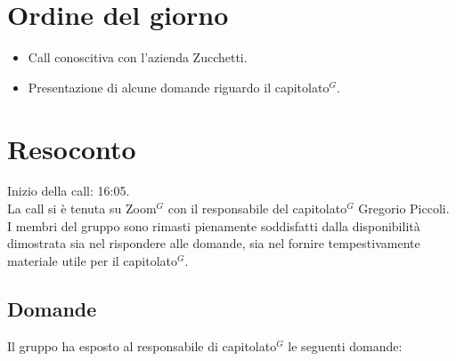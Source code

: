 \section{Ordine del giorno}

\begin{itemize}
	\item Call conoscitiva con l'azienda Zucchetti.
	\item Presentazione di alcune domande riguardo il capitolato$^{G}$.
\end{itemize}

\section{Resoconto}

\noindent 
Inizio della call: 16:05. \\
\noindent La call si è tenuta su Zoom$^{G}$ con il responsabile del capitolato$^{G}$ Gregorio Piccoli. 
I membri del gruppo sono rimasti pienamente soddisfatti dalla disponibilità dimostrata sia nel rispondere alle domande, sia nel fornire tempestivamente materiale utile per il capitolato$^{G}$.

\subsection{Domande}

Il gruppo ha esposto al responsabile di capitolato$^{G}$ le seguenti domande:

